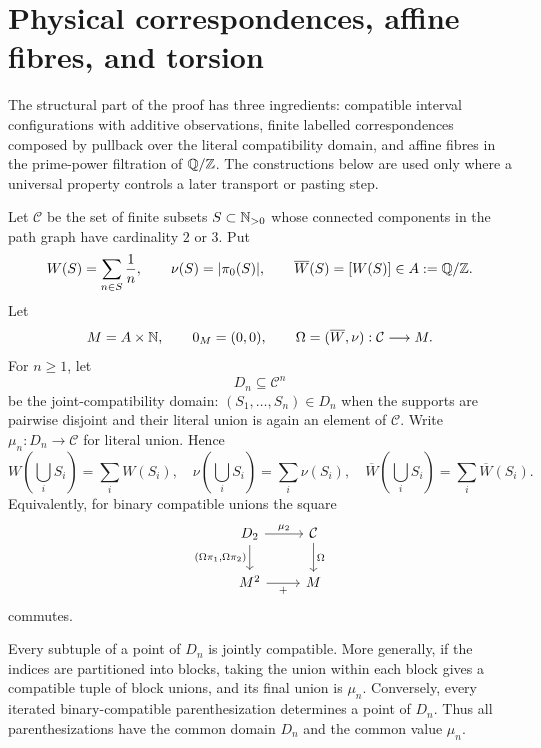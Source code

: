 \section{Physical correspondences, affine fibres, and torsion}
\label{sec:states-filtration}

The structural part of the proof has three ingredients: compatible interval configurations with additive observations, finite labelled correspondences composed by pullback over the literal compatibility domain, and affine fibres in the prime-power filtration of $\mathbb Q/\mathbb Z$.  The constructions below are used only where a universal property controls a later transport or pasting step.

Let $\mathcal C$ be the set of finite subsets $S\subset\mathbb N_{>0}$ whose connected components in the path graph have cardinality $2$ or $3$.  Put
\begin{equation}\label{eq:observations}
W(S)=\sum_{n\in S}\frac1n,
\qquad
\nu(S)=|\pi_0(S)|,
\qquad
\overline W(S)=[W(S)]\in A:=\mathbb Q/\mathbb Z.
\end{equation}
Let
\[
M=A\times\mathbb N,
\qquad
0_M=(0,0),
\qquad
\Omega=(\overline W,\nu):\mathcal C\longrightarrow M.
\]
For $n\ge1$, let
\[
D_n\subseteq\mathcal C^n
\]
be the joint-compatibility domain: $(S_1,\ldots,S_n)\in D_n$ when the supports are pairwise disjoint and their literal union is again an element of $\mathcal C$.  Write $\mu_n:D_n\to\mathcal C$ for literal union.  Hence
\begin{equation}\label{eq:additive-observations}
W\!\left(\bigcup_iS_i\right)=\sum_iW(S_i),
\quad
\nu\!\left(\bigcup_iS_i\right)=\sum_i\nu(S_i),
\quad
\overline W\!\left(\bigcup_iS_i\right)=\sum_i\overline W(S_i).
\end{equation}
Equivalently, for binary compatible unions the square
\begin{equation}\label{eq:observation-square}
\begin{tikzcd}
D_2 \arrow[r,"{\mu_2}"] \arrow[d,"{(\Omega\pi_1,\Omega\pi_2)}"']
  & \mathcal C \arrow[d,"{\Omega}"]\\
M^2 \arrow[r,"{+}"'] & M
\end{tikzcd}
\end{equation}
commutes.

\begin{lemma}\label{lem:compatibility-substitution}
Every subtuple of a point of $D_n$ is jointly compatible.  More generally, if the indices are partitioned into blocks, taking the union within each block gives a compatible tuple of block unions, and its final union is $\mu_n$.  Conversely, every iterated binary-compatible parenthesization determines a point of $D_n$.  Thus all parenthesizations have the common domain $D_n$ and the common value $\mu_n$.
\end{lemma}

